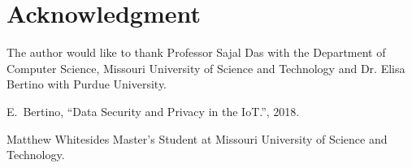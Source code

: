 \documentclass[journal,onecolumn]{IEEEtran}
\begin{document}
\section*{Acknowledgment}
The author would like to thank Professor Sajal Das with the Department of Computer Science, Missouri University of Science and Technology and Dr. Elisa Bertino with Purdue University.

\ifCLASSOPTIONcaptionsoff
  \newpage
\fi

\begin{thebibliography}{1}

E.~Bertino, ``Data Security and Privacy in the IoT.'', 2018. 

\end{thebibliography}

\begin{IEEEbiographynophoto}{Matthew Whitesides}
  Master's Student at Missouri University of Science and Technology.
\end{IEEEbiographynophoto}

\end{document}
